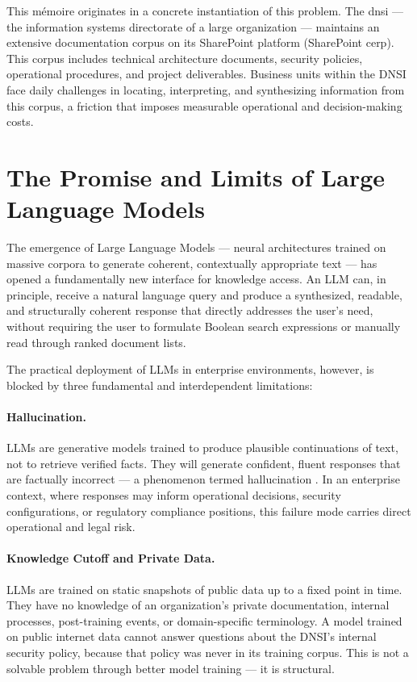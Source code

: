 This mémoire originates in a concrete instantiation of this problem. The \gls{dnsi} — the information systems directorate of a large organization — maintains an extensive documentation corpus on its SharePoint platform (SharePoint \gls{cerp}). This corpus includes technical architecture documents, security policies, operational procedures, and project deliverables. Business units within the DNSI face daily challenges in locating, interpreting, and synthesizing information from this corpus, a friction that imposes measurable operational and decision-making costs.

\section{The Promise and Limits of Large Language Models}
\label{sec:intro-llm}

The emergence of Large Language Models — neural architectures trained on massive corpora to generate coherent, contextually appropriate text \citep{Brown2020, Chowdhery2022} — has opened a fundamentally new interface for knowledge access. An LLM can, in principle, receive a natural language query and produce a synthesized, readable, and structurally coherent response that directly addresses the user's need, without requiring the user to formulate Boolean search expressions or manually read through ranked document lists.

The practical deployment of LLMs in enterprise environments, however, is blocked by three fundamental and interdependent limitations:

\paragraph{Hallucination.} LLMs are generative models trained to produce plausible continuations of text, not to retrieve verified facts. They will generate confident, fluent responses that are factually incorrect — a phenomenon termed hallucination \citep{Maynez2020, Ji2023}. In an enterprise context, where responses may inform operational decisions, security configurations, or regulatory compliance positions, this failure mode carries direct operational and legal risk.

\paragraph{Knowledge Cutoff and Private Data.} LLMs are trained on static snapshots of public data up to a fixed point in time. They have no knowledge of an organization's private documentation, internal processes, post-training events, or domain-specific terminology. A model trained on public internet data cannot answer questions about the DNSI's internal security policy, because that policy was never in its training corpus. This is not a solvable problem through better model training — it is structural.

